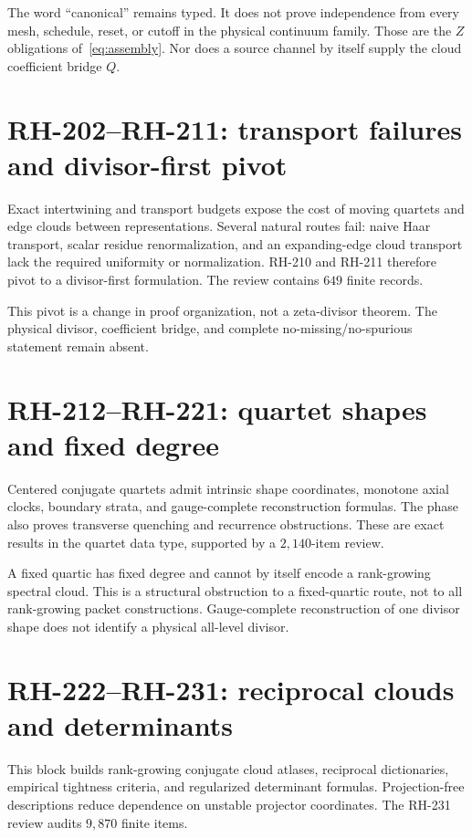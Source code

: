 \documentclass[11pt]{article}
\theoremstyle{definition}
\theoremstyle{remark}
\begin{document}
The word ``canonical'' remains typed.  It does not prove independence from
every mesh, schedule, reset, or cutoff in the physical continuum family.
Those are the $Z$ obligations of~\eqref{eq:assembly}.  Nor does a source
channel by itself supply the cloud coefficient bridge $Q$.

\section{RH-202--RH-211: transport failures and divisor-first pivot}

Exact intertwining and transport budgets expose the cost of moving quartets
and edge clouds between representations.  Several natural routes fail:
naive Haar transport, scalar residue renormalization, and an expanding-edge
cloud transport lack the required uniformity or normalization.  RH-210 and
RH-211 therefore pivot to a divisor-first formulation.  The review contains
$649$ finite records.

This pivot is a change in proof organization, not a zeta-divisor theorem.
The physical divisor, coefficient bridge, and complete no-missing/no-spurious
statement remain absent.

\section{RH-212--RH-221: quartet shapes and fixed degree}

Centered conjugate quartets admit intrinsic shape coordinates, monotone axial
clocks, boundary strata, and gauge-complete reconstruction formulas.  The
phase also proves transverse quenching and recurrence obstructions.  These
are exact results in the quartet data type, supported by a $2{,}140$-item
review.

A fixed quartic has fixed degree and cannot by itself encode a rank-growing
spectral cloud.  This is a structural obstruction to a fixed-quartic route,
not to all rank-growing packet constructions.  Gauge-complete reconstruction
of one divisor shape does not identify a physical all-level divisor.

\section{RH-222--RH-231: reciprocal clouds and determinants}

This block builds rank-growing conjugate cloud atlases, reciprocal
dictionaries, empirical tightness criteria, and regularized determinant
formulas.  Projection-free descriptions reduce dependence on unstable
projector coordinates.  The RH-231 review audits $9{,}870$ finite items.
\end{document}
